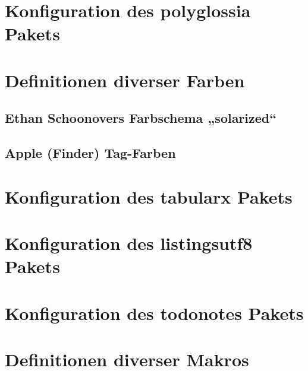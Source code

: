 %
%
	\label{sec:Definitionen}



\section{Konfiguration des polyglossia Pakets}
\section{Definitionen diverser Farben}
	\subsection{Ethan Schoonovers Farbschema „solarized“}
	\subsection{Apple (Finder) Tag-Farben}
\section{Konfiguration des tabularx Pakets}
\section{Konfiguration des listingsutf8 Pakets}
\section{Konfiguration des todonotes Pakets}
\section{Definitionen diverser Makros}



